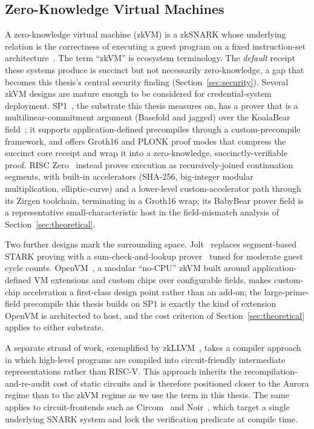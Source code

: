 \subsection{Zero-Knowledge Virtual Machines}
A zero-knowledge virtual machine (zkVM) is a zkSNARK whose underlying relation is the correctness of executing a guest program on a fixed instruction-set architecture~\cite{cryptoeprint:2023/1032,lavin2024surveyapplicationszeroknowledgeproofs}. The term ``zkVM'' is ecosystem terminology. The \emph{default} receipt these systems produce is succinct but not necessarily zero-knowledge, a gap that becomes this thesis's central security finding (Section~\ref{sec:security}). Several zkVM designs are mature enough to be considered for credential-system deployment. SP1~\cite{succinct2024sp1}, the substrate this thesis measures on, has a prover that is a multilinear-commitment argument (Basefold and jagged) over the KoalaBear field~\cite{basefold2023}; it supports application-defined precompiles through a custom-precompile framework, and offers Groth16 and PLONK proof modes that compress the succinct core receipt and wrap it into a zero-knowledge, succinctly-verifiable proof. RISC Zero~\cite{bruestle2023risczero} instead proves execution as recursively-joined continuation segments, with built-in accelerators (SHA-256, big-integer modular multiplication, elliptic-curve) and a lower-level custom-accelerator path through its Zirgen toolchain, terminating in a Groth16 wrap; its BabyBear prover field is a representative small-characteristic host in the field-mismatch analysis of Section~\ref{sec:theoretical}.

Two further designs mark the surrounding space. Jolt~\cite{cryptoeprint:2023/1217} replaces segment-based STARK proving with a sum-check-and-lookup prover~\cite{setty2024lasso} tuned for moderate guest cycle counts. OpenVM~\cite{openvm2025}, a modular ``no-CPU'' zkVM built around application-defined VM extensions and custom chips over configurable fields, makes custom-chip acceleration a first-class design point rather than an add-on; the large-prime-field precompile this thesis builds on SP1 is exactly the kind of extension OpenVM is architected to host, and the cost criterion of Section~\ref{sec:theoretical} applies to either substrate.

A separate strand of work, exemplified by zkLLVM~\cite{Kaskov2024zkLLVM}, takes a compiler approach in which high-level programs are compiled into circuit-friendly intermediate representations rather than RISC-V. This approach inherits the recompilation-and-re-audit cost of static circuits and is therefore positioned closer to the Aurora regime than to the zkVM regime as we use the term in this thesis. The same applies to circuit-frontends such as Circom~\cite{10002421} and Noir~\cite{noir_lang}, which target a single underlying SNARK system and lock the verification predicate at compile time.

